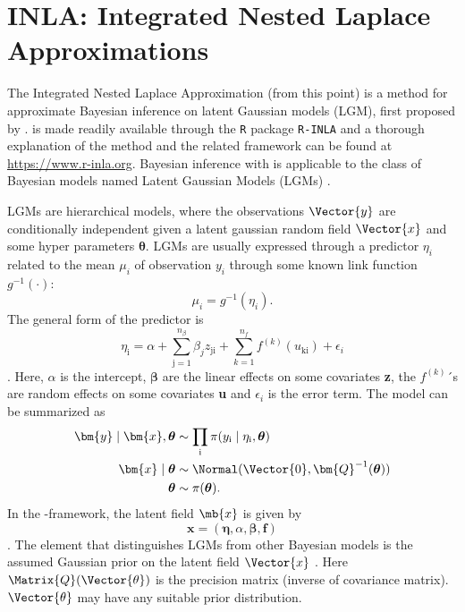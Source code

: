 \newpage
\section{INLA: Integrated Nested Laplace Approximations}
The Integrated Nested Laplace Approximation (\inla from this point) is a method for approximate Bayesian inference on latent Gaussian models (LGM), first proposed by \textcite{rue2009inla}. \inla is made readily available through the \texttt{R} package \texttt{R-INLA} and a thorough explanation of the method and the related framework can be found at \url{https://www.r-inla.org}. 
Bayesian inference with \inla is applicable to the class of Bayesian models named Latent Gaussian Models (LGMs) \parencite{rue2009inla}.  

\newpar LGMs are hierarchical models, where the observations $\Vector{y}$ are conditionally independent given a latent gaussian random field $\Vector{x}$ and some hyper parameters $\boldsymbol{\theta}$.
LGMs are usually expressed through a predictor $\eta_i$ related to the mean $\mu_i$ of observation $y_i$ through some known link function $g^{-1}(\cdot)$:
\begin{equation}
    \mu_i = g^{-1}(\eta_i).
    \label{eq:LGMlinkFunction}
\end{equation}
The general form of the predictor is
\begin{equation}
    \eta_\text{i} = \alpha + \sum_{\text{j}=1}^{n_{\beta}}\beta_j z_{\text{ji}} + \sum_{k=1}^{n_f}f^{(k)}(u_{\text{ki}}) + \epsilon_{i}
    \label{LGM-linear-predictor}
\end{equation}
\parencite{rue2009inla}. Here, $\alpha$ is the intercept, $\boldsymbol{\beta}$ are the linear effects on some covariates \textbf{z}, the $f^{(k)}$´s are random effects on some covariates \textbf{u} and $\epsilon_i$ is the error term. The model can be summarized as 
\begin{equation}
    \begin{aligned}
    \bm{y}\mid \bm{x}, \boldsymbol{\theta} &\sim \prod_{\text{i}} \pi (y_{\text{i}} \mid \eta_{\text{i}}, \boldsymbol{\theta})\\
    \bm{x} \mid \boldsymbol{\theta} &\sim \Normal(\Vector{0}, \bm{Q}^{-1}(\boldsymbol{\theta})) \\
    \boldsymbol{\theta} &\sim \pi(\boldsymbol{\theta}).
    \end{aligned}
    \label{LGM-model-summarized}
\end{equation}
In the \inla-framework, the latent field $\mb{x}$ is given by
\begin{equation}
    \bm{x} = (\boldsymbol{\eta}, \alpha, \boldsymbol{\beta}, \boldsymbol{f})
    \label{LGM-latent-field}
\end{equation}
\parencite{martinoRiebler2019}. The element that distinguishes LGMs from other Bayesian models is the assumed Gaussian prior on the latent field $\Vector{x}$ \parencite{rue2009inla}. Here $\Matrix{Q}(\Vector{\theta})$ is the precision matrix (inverse of covariance matrix). $\Vector{\theta}$ may have any suitable prior distribution. 

